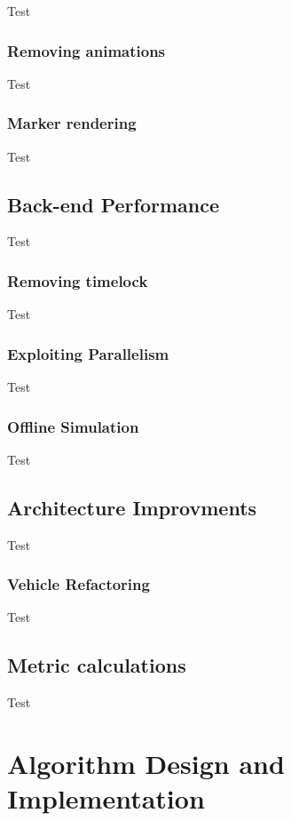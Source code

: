 \documentclass[ %
                    author={Alexander Hill},
                supervisor={Dr. Benjamin Sach},
                    degree={MEng},
                     title={MARMOSET: Multi Agent Real-time Multi-core Online
                     Simulation for Efficient Transportation},
                  subtitle={},
                      type={research},
                      year={2016} ]{dissertation}
\begin{document}
Test

\subsubsection{Removing animations}

Test

\subsubsection{Marker rendering}

Test

\subsection{Back-end Performance}

Test

\subsubsection{Removing timelock}

Test

\subsubsection{Exploiting Parallelism}

Test

\subsubsection{Offline Simulation}

Test

\subsection{Architecture Improvments}

Test

\subsubsection{Vehicle Refactoring}

Test

\subsection{Metric calculations}

Test

\section{Algorithm Design and Implementation}
\end{document}
